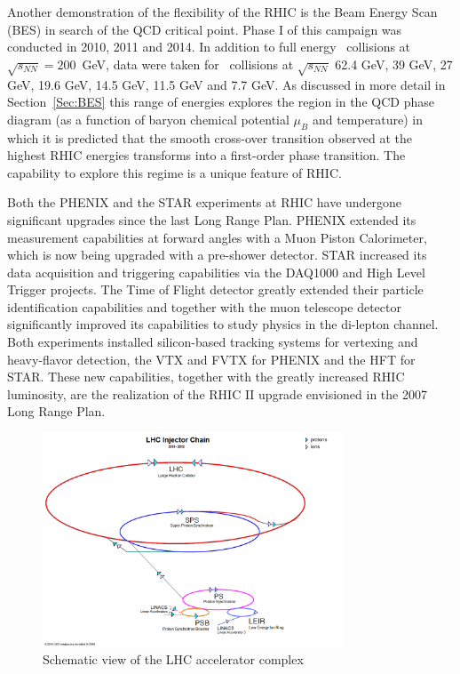 Another demonstration of the flexibility of the RHIC is the Beam Energy Scan (BES) in search of the QCD critical point.  Phase I of this campaign was conducted in 2010, 2011 and 2014. In addition to full energy \AuAu\ collisions at $\sqrt{s_{NN}} = 200$~GeV, data were taken for \AuAu\ collisions at 
$\sqrt{s_{NN}}$ 62.4 GeV, 39 GeV, 27 GeV, 19.6 GeV, 14.5 GeV, 11.5 GeV and 7.7 GeV. As discussed in more detail in Section~\ref{Sec:BES} this range of energies explores the region in the QCD phase diagram (as a function of baryon chemical potential $\mu_B$ and temperature) in which it is predicted that the smooth cross-over transition observed at the highest RHIC energies transforms into a first-order phase transition. The capability to explore this regime is a unique feature of RHIC.

Both the PHENIX\cite{PHENIX} and the STAR\cite{STAR} experiments at RHIC have undergone significant upgrades since the last Long Range Plan. PHENIX extended its measurement capabilities at forward angles with a Muon Piston Calorimeter\cite{Chiu:2007zy}, which is now being upgraded with a pre-shower detector\cite{Campbell:2013zw}. 
STAR increased its data acquisition and triggering capabilities via the DAQ1000\cite{STAR:DAQ1000} and High Level Trigger\cite{STAR:HLT}
projects. The Time of Flight\cite{STAR:TOF} detector greatly extended their particle identification capabilities
and together with the muon telescope  detector\cite{Ruan:2009ug} significantly improved its capabilities to study physics in the di-lepton channel.
Both experiments installed silicon-based tracking systems for vertexing and heavy-flavor detection, 
the VTX\cite{Nouicer:2008pf,Taketani:2010zz} and FVTX\cite{Aidala:2013vna} for PHENIX and the HFT\cite{Kapitan:2008kk,Qiu:2014dha} for STAR. These new capabilities, together with the greatly increased RHIC luminosity, are the realization of the RHIC II upgrade envisioned in the 2007 Long Range Plan.

\begin{figure}[!htb]
\begin{center}
\includegraphics[width=0.8\textwidth]{fig/LHC_chain.png}
\caption{Schematic view of the LHC accelerator complex}
\label{fig:lhc_complex}
\end{center}
\end{figure}
 
